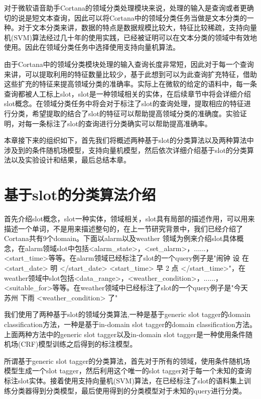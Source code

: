 \documentclass[master]{njuthesis}
\begin{document}
    对于微软语音助手Cortana的领域分类处理模块来说，处理的输入是查询或者更确切的说是短文本查询，因此可以将Cortana中的领域分类任务当做是文本分类的一种。对于文本分类来讲，数据的特点是数据规模比较大，特征比较稀疏，支持向量机(SVM)算法经过几十年的使用实践，已经被证明可以在文本分类的领域中有效地使用。因此在领域分类任务中选择使用支持向量机算法。
    
    由于Cortana中的领域分类模块处理的输入查询长度非常短，因此对于每一个查询来讲，可以提取利用的特征数量比较少，基于此想到可以为此查询扩充特征，借助这些扩充的特征来提高领域分类的准确率。实际上在微软的给定的语料中，每一条查询都被人工标上slot，slot是一种领域相关的实体，在后续章节中将会详细介绍slot概念。在领域分类任务中将会对于标注了slot的查询处理，提取相应的特征进行分类，希望提取的结合了slot的特征可以帮助提高领域分类的准确度。实验证明，对每一条标注了slot的查询进行分类确实可以帮助提高准确率。
    
    本章接下来的组织如下，首先我们将概述两种基于slot的分类算法以及两种算法中涉及到的条件随机场模型，支持向量机模型，然后依次详细介绍基于slot的分类算法以及实验设计和结果，最后总结本章。

    
\section{基于slot的分类算法介绍}
   
    首先介绍slot概念，slot一种实体，领域相关，slot具有局部的描述作用，可以用来描述一个单词，不是用来描述整句的\cite{slot}，在上一节研究背景中，我们已经介绍了Cortana共有9个domain。下面以alarm以及weather 领域为例来介绍slot具体概念，在alarm领域slot中包括<alarm\_state>，<set\_alarm>，......，<start\_time>等等。在alarm领域已经标注了slot的一个query例子是"闹钟 设 在 <start\_date> 明 </start\_date> <start\_time> 早 2 点 </start\_time>"，在weather领域中slot包括<data\_range>，<weather\_condition>，......，<suitable\_for>等等。在weather领域中已经标注了slot的一个query例子是"今天 苏州 下雨 <weather\_condition> 了"

    我们使用了两种基于slot的领域分类算法,一种是基于generic slot tagger的domain classification方法，一种是基于in-domain slot tagger的domain classification方法。上面两种方法中的generic slot tagger以及in-domain slot tagger是一种使用条件随机场(CRF)模型训练之后得到的标注模型。
    
    所谓基于generic slot tagger的分类算法，首先对于所有的领域，使用条件随机场模型生成一个slot tagger，然后利用这个唯一的slot tagger对于每一个未知的查询标注slot实体。接着使用支持向量机(SVM)算法，在已经标注了slot的语料集上训练分类器得到分类模型，最后使用得到的分类模型对于未知的query进行分类。
\end{document}
